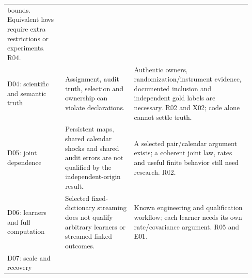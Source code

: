 \documentclass[
  11pt,
  a4paper,
]{article}
\begin{document}
\begin{longtable}[]{@{}lll@{}}
\begin{minipage}[t]{0.30\columnwidth}
bounds. Equivalent laws require extra restrictions or experiments.
R04.\strut
\end{minipage}\tabularnewline
\begin{minipage}[t]{0.30\columnwidth}\raggedright
D04: scientific and semantic truth\strut
\end{minipage} & \begin{minipage}[t]{0.30\columnwidth}\raggedright
Assignment, audit truth, selection and ownership can violate
declarations.\strut
\end{minipage} & \begin{minipage}[t]{0.30\columnwidth}\raggedright
Authentic owners, randomization/instrument evidence, documented
inclusion and independent gold labels are necessary. R02 and X02; code
alone cannot settle truth.\strut
\end{minipage}\tabularnewline
\begin{minipage}[t]{0.30\columnwidth}\raggedright
D05: joint dependence\strut
\end{minipage} & \begin{minipage}[t]{0.30\columnwidth}\raggedright
Persistent maps, shared calendar shocks and shared audit errors are not
qualified by the independent-origin result.\strut
\end{minipage} & \begin{minipage}[t]{0.30\columnwidth}\raggedright
A selected pair/calendar argument exists; a coherent joint law, rates
and useful finite behavior still need research. R02.\strut
\end{minipage}\tabularnewline
\begin{minipage}[t]{0.30\columnwidth}\raggedright
D06: learners and full computation\strut
\end{minipage} & \begin{minipage}[t]{0.30\columnwidth}\raggedright
Selected fixed-dictionary streaming does not qualify arbitrary learners
or streamed linked outcomes.\strut
\end{minipage} & \begin{minipage}[t]{0.30\columnwidth}\raggedright
Known engineering and qualification workflow; each learner needs its own
rate/covariance argument. R05 and E01.\strut
\end{minipage}\tabularnewline
\begin{minipage}[t]{0.30\columnwidth}\raggedright
D07: scale and recovery\strut
\end{minipage} & \begin{minipage}[t]{0.30\columnwidth}\raggedright

\end{minipage}
\end{longtable}
\end{document}

